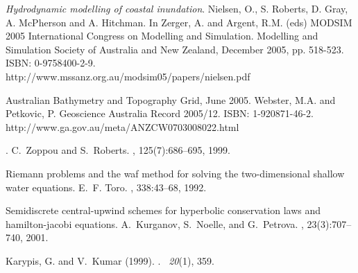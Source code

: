 \documentclass{manual}
\begin{document}

%
%
%




\begin{thebibliography}{99}
{\it Hydrodynamic modelling of coastal inundation}.
Nielsen, O., S. Roberts, D. Gray, A. McPherson and A. Hitchman.
In Zerger, A. and Argent, R.M. (eds) MODSIM 2005 International Congress on
Modelling and Simulation. Modelling and Simulation Society of Australia and
New Zealand, December 2005, pp. 518-523. ISBN: 0-9758400-2-9.\\
http://www.mssanz.org.au/modsim05/papers/nielsen.pdf

Australian Bathymetry and Topography Grid, June 2005.
Webster, M.A. and Petkovic, P.
Geoscience Australia Record 2005/12. ISBN: 1-920871-46-2.\\
http://www.ga.gov.au/meta/ANZCW0703008022.html

.
\newblock C.~Zoppou and S.~Roberts.
, 125(7):686--695, 1999.

\newblock Riemann problems and the waf method for solving the two-dimensional
  shallow water equations.
\newblock E.~F. Toro.
,
  338:43--68, 1992.

\newblock Semidiscrete central-upwind schemes for hyperbolic conservation laws
  and hamilton-jacobi equations.
\newblock A.~Kurganov, S.~Noelle, and G.~Petrova.
, 23(3):707--740, 2001.


Karypis, G. and V.~Kumar (1999).
.
~{\em 20\/}(1), 359.


\end{thebibliography}
\end{document}
